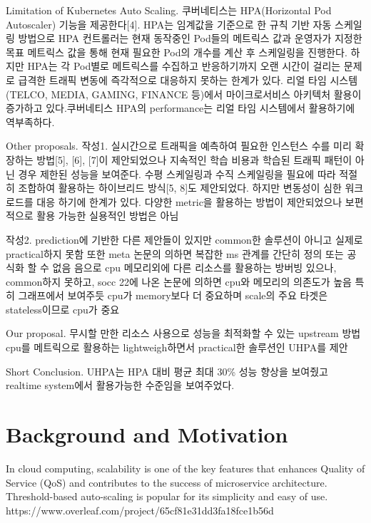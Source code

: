 \documentclass[conference]{IEEEtran}
\begin{document}
Limitation of Kubernetes Auto Scaling.
쿠버네티스는 HPA(Horizontal Pod Autoscaler) 기능을 제공한다[4].
HPA는 임계값을 기준으로 한 규칙 기반 자동 스케일링 방법으로 HPA 컨트롤러는 현재 동작중인 Pod들의 메트릭스 값과 운영자가 지정한 목표 메트릭스 값을 통해 현재 필요한 Pod의 개수를 계산 후 스케일링을 진행한다. 하지만 HPA는 각 Pod별로 메트릭스를 수집하고 반응하기까지 오랜 시간이 걸리는 문제로 급격한 트래픽 변동에 즉각적으로 대응하지 못하는 한계가 있다. 리얼 타임 시스템(TELCO, MEDIA, GAMING, FINANCE 등)에서 마이크로서비스 아키텍처 활용이 증가하고 있다.쿠버네티스 HPA의 performance는 리얼 타임 시스템에서 활용하기에 역부족하다.

Other proposals.
작성1. 실시간으로 트래픽을 예측하여 필요한 인스턴스 수를 미리 확장하는 방법[5], [6], [7]이 제안되었으나 지속적인 학습 비용과 학습된 트래픽 패턴이 아닌 경우 제한된 성능을 보여준다. 수평 스케일링과 수직 스케일링을 필요에 따라 적절히 조합하여 활용하는 하이브리드 방식[5, 8]도 제안되었다. 하지만 변동성이 심한 워크로드를 대응 하기에 한계가 있다. 다양한 metric을 활용하는 방법이 제안되었으나 보편적으로 활용 가능한 실용적인 방법은 아님

작성2. prediction에 기반한 다른 제안들이 있지만 common한 솔루션이 아니고 실제로 practical하지 못함
또한 meta 논문의 의하면 복잡한 ms 관계를 간단히 정의 또는 공식화 할 수 없음
음으로 cpu 메모리외에 다른 리소스를 활용하는 방버빙 있으나, common하지 못하고, socc 22에 나온 논문에 의하면 cpu와 메모리의 의존도가 높음 특히 그래프에서 보여주듯 cpu가 memory보다 더 중요하며 scale의 주요 타겟은 stateless이므로 cpu가 중요

Our proposal.
무시할 만한 리소스 사용으로 성능을 최적화할 수 있는 upstream 방법
cpu를 메트릭으로 활용하는 lightweigh하면서 practical한 솔루션인 UHPA를 제안

Short Conclusion.
UHPA는 HPA 대비 평균 최대 30\% 성능 향상을 보여줬고 realtime system에서 활용가능한 수준임을 보여주었다.



\section{Background and Motivation}
In cloud computing, scalability is one of the key features that enhances Quality of Service (QoS) and contributes to the success of microservice architecture. Threshold-based auto-scaling is popular for its simplicity and easy of use. https://www.overleaf.com/project/65cf81e31dd3fa18fce1b56d
\end{document}
